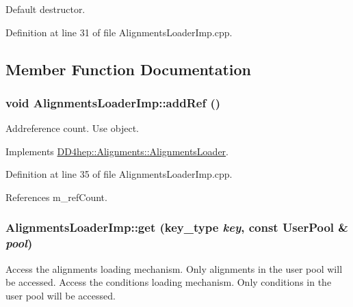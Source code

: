 Default destructor. 

Definition at line 31 of file AlignmentsLoaderImp.cpp.

\subsection{Member Function Documentation}
\hypertarget{class_d_d4hep_1_1_conditions_1_1_alignments_loader_imp_ac4797b3da6e5543cf505eca8bf9cb405}{
\subsubsection[{addRef}]{\setlength{\rightskip}{0pt plus 5cm}void AlignmentsLoaderImp::addRef ()}}
\label{class_d_d4hep_1_1_conditions_1_1_alignments_loader_imp_ac4797b3da6e5543cf505eca8bf9cb405}


Addreference count. Use object. 

Implements \hyperlink{class_d_d4hep_1_1_alignments_1_1_alignments_loader_a47a4586ac933395c27b705939985f41f}{DD4hep::Alignments::AlignmentsLoader}.

Definition at line 35 of file AlignmentsLoaderImp.cpp.

References m\_\-refCount.\hypertarget{class_d_d4hep_1_1_conditions_1_1_alignments_loader_imp_ab37a7e41559862d5c424fcad50bb6768}{
\subsubsection[{get}]{ AlignmentsLoaderImp::get ({\bf key\_\-type} {\em key}, \/  const {\bf UserPool} \& {\em pool})}}
\label{class_d_d4hep_1_1_conditions_1_1_alignments_loader_imp_ab37a7e41559862d5c424fcad50bb6768}


Access the alignments loading mechanism. Only alignments in the user pool will be accessed. Access the conditions loading mechanism. Only conditions in the user pool will be accessed. 

